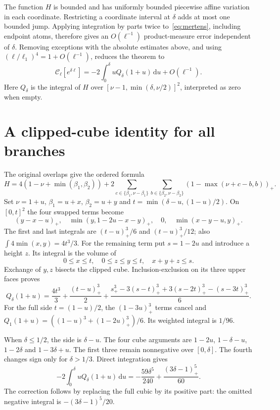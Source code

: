 \documentclass[11pt]{article}
\newcommand{\dd}{\,\mathrm d}
\newcommand{\Core}{\mathcal C}
\begin{document}
The function $H$ is bounded and has uniformly bounded piecewise affine
variation in each coordinate. Restricting a coordinate interval at
$\delta$ adds at most one bounded jump. Applying integration by parts
twice to~\eqref{eq:mertens}, including endpoint atoms, therefore gives
an $O(\ell^{-1})$ product-measure error independent of $\delta$.
Removing exceptions with the absolute estimates above, and using
$(\ell/\ell_1)^4=1+O(\ell^{-1})$, reduces the theorem to
\begin{equation}\label{eq:reduction}
 \Core_\ell[e^{\delta\ell}]
 =-2\int_0^\delta u Q_\delta(1+u)\dd u+O(\ell^{-1}).
\end{equation}
Here $Q_\delta$ is the integral of $H$ over
$[\nu-1,\min(\delta,\nu/2)]^2$, interpreted as zero when empty.

\section{A clipped-cube identity for all branches}
The original overlaps give the ordered formula
\[
 H=4(1-\nu+\min(\beta_1,\beta_2))
   +2\sum_{c\in\{\beta_1,\nu-\beta_1\}}
       \sum_{b\in\{\beta_2,\nu-\beta_2\}}
                   (1-\max(\nu+c-b,b))_+.
\]
Set $\nu=1+u$, $\beta_1=u+x$, $\beta_2=u+y$ and
$t=\min(\delta-u,(1-u)/2)$.
On $[0,t]^2$ the four swapped terms become
\[
 (y-x-u)_+,\quad\min(y,1-2u-x-y)_+,\quad0,\quad
 \min(x-y-u,y)_+.
\]
The first and last integrals are $(t-u)_+^3/6$ and
$(t-u)_+^3/12$; also $\int4\min(x,y)=4t^3/3$.
For the remaining term put $s=1-2u$ and introduce a height $z$.
Its integral is the volume of
\[
 0\leq x\leq t,\quad0\leq z\leq y\leq t,\quad x+y+z\leq s.
\]
Exchange of $y,z$ bisects the clipped cube. Inclusion-exclusion on
its three upper faces proves
\begin{equation}\label{eq:q}
 Q_\delta(1+u)=\frac{4t^3}{3}+\frac{(t-u)_+^3}{2}
 +\frac{s_+^3-3(s-t)_+^3+3(s-2t)_+^3-(s-3t)_+^3}{6}.
\end{equation}
For the full side $t=(1-u)/2$, the $(1-3u)_+^3$ terms cancel and
$Q_1(1+u)=((1-u)^3+(1-2u)_+^3)/6$. Its weighted integral is $1/96$.

When $\delta\leq1/2$, the side is $\delta-u$. The four cube arguments
are $1-2u$, $1-\delta-u$, $1-2\delta$ and $1-3\delta+u$.
The first three remain nonnegative over $[0,\delta]$. The fourth
changes sign only for $\delta>1/3$. Direct integration gives
\[
 -2\int_0^\delta u Q_\delta(1+u)\dd u
 =-\frac{59\delta^5}{240}+\frac{(3\delta-1)_+^5}{60}.
\]
The correction follows by replacing the full cubic by its positive
part: the omitted negative integral is $-(3\delta-1)^5/20$.
\end{document}
